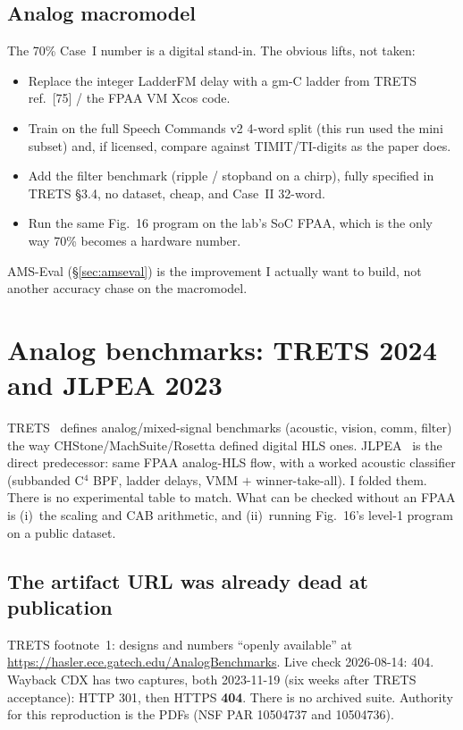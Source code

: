 \documentclass[11pt]{article}
\begin{document}
\subsection{Analog macromodel}

The 70\% Case~I number is a digital stand-in. The obvious lifts, not
taken:

\begin{itemize}
\item Replace the integer LadderFM delay with a gm-C ladder from
TRETS ref.~[75] / the FPAA VM Xcos code.
\item Train on the full Speech Commands v2 4-word split (this run used
the mini subset) and, if licensed, compare against TIMIT/TI-digits as
the paper does.
\item Add the filter benchmark (ripple / stopband on a chirp), fully
specified in TRETS \S3.4, no dataset, cheap, and Case~II 32-word.
\item Run the same Fig.~16 program on the lab's SoC FPAA, which is the
only way 70\% becomes a hardware number.
\end{itemize}

AMS-Eval (\S\ref{sec:amseval}) is the improvement I actually want to
build, not another accuracy chase on the macromodel.

\section{Analog benchmarks: TRETS 2024 and JLPEA 2023}
\label{sec:ams}

TRETS~\cite{trets} defines analog/mixed-signal benchmarks (acoustic,
vision, comm, filter) the way CHStone/MachSuite/Rosetta defined digital
HLS ones. JLPEA~\cite{jlpea} is the direct predecessor: same FPAA
analog-HLS flow, with a worked acoustic classifier (subbanded C$^4$ BPF,
ladder delays, VMM $+$ winner-take-all). I folded them. There is no
experimental table to match. What can be checked without an FPAA is
(i)~the scaling and CAB arithmetic, and (ii)~running Fig.~16's
level-1 program on a public dataset.

\subsection{The artifact URL was already dead at publication}

TRETS footnote~1: designs and numbers ``openly available'' at
\url{https://hasler.ece.gatech.edu/AnalogBenchmarks}. Live check
2026-08-14: 404. Wayback CDX has two captures, both 2023-11-19 (six
weeks after TRETS acceptance): HTTP 301, then HTTPS \textbf{404}. There
is no archived suite. Authority for this reproduction is the PDFs
(NSF PAR 10504737 and 10504736).
\end{document}
